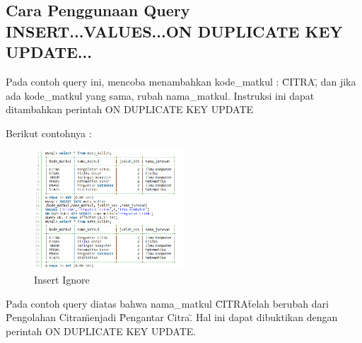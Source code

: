 	\subsection{Cara Penggunaan Query INSERT...VALUES...ON DUPLICATE KEY UPDATE...}
	Pada contoh query ini, mencoba menambahkan kode_matkul : \"CITRA\" , dan jika ada kode_matkul yang sama, rubah nama_matkul. Instruksi ini dapat ditambahkan perintah ON DUPLICATE KEY UPDATE
	
	Berikut contohnya :
	
		\begin{figure}[ht]
			\centerline{\includegraphics[width=0.5\textwidth]{figures/insert8.png}}
			\caption{Insert Ignore}
			\label{insert8}
			\end{figure}
	
	Pada contoh query diatas bahwa nama_matkul \"CITRA\" telah berubah dari \"Pengolahan Citra\" menjadi \"Pengantar Citra\". Hal ini dapat dibuktikan dengan perintah ON DUPLICATE KEY UPDATE.
	
\cite{sofwan2003belajar}
\cite{kadir2010mudah}